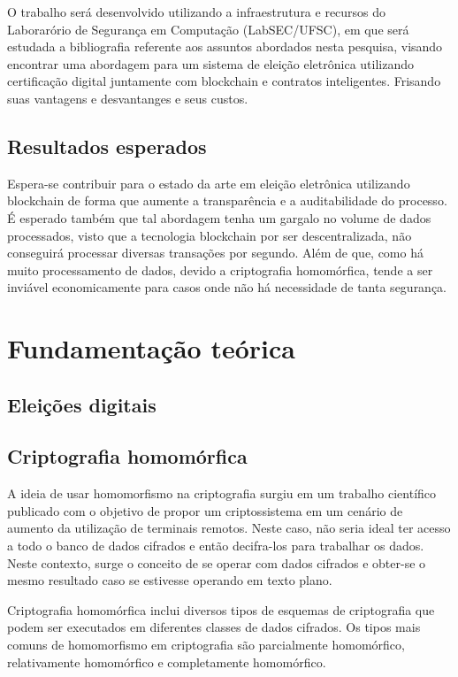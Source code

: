\documentclass{ufsctex/ufsctex}
\begin{document}
O trabalho será desenvolvido utilizando a infraestrutura e recursos do
Laborarório de Segurança em Computação (LabSEC/UFSC), em que será estudada
a bibliografia referente aos assuntos abordados nesta pesquisa, visando
encontrar uma abordagem para um sistema de eleição eletrônica utilizando
certificação digital juntamente com blockchain e contratos inteligentes.
Frisando suas vantagens e desvantanges e seus custos.

\section{Resultados esperados}

Espera-se contribuir para o estado da arte em eleição eletrônica utilizando
blockchain de forma que aumente a transparência e a auditabilidade do
processo. É esperado também que tal abordagem tenha um gargalo no volume de
dados processados, visto que a tecnologia blockchain por ser descentralizada,
não conseguirá processar diversas transações por segundo. Além de que,
como há muito processamento de dados, devido a criptografia homomórfica,
tende a ser inviável economicamente para casos onde não há necessidade de
tanta segurança.

\chapter{Fundamentação teórica}

\section{Eleições digitais}

\section{Criptografia homomórfica}

A ideia de usar homomorfismo na criptografia surgiu em um trabalho científico
publicado com o objetivo de propor um criptossistema em um cenário de aumento da utilização
de terminais remotos. Neste caso, não seria ideal ter acesso a todo o banco de dados
cifrados e então decifra-los para trabalhar os dados. Neste contexto, surge o conceito
de se operar com dados cifrados e obter-se o mesmo resultado caso se estivesse operando em
texto plano.\cite{homomorphic}

Criptografia homomórfica inclui diversos tipos de esquemas de criptografia que podem
ser executados em diferentes classes de dados cifrados. Os tipos mais comuns de homomorfismo
em criptografia são parcialmente homomórfico, relativamente homomórfico e completamente
homomórfico.\cite{survey-homo}
\end{document}
